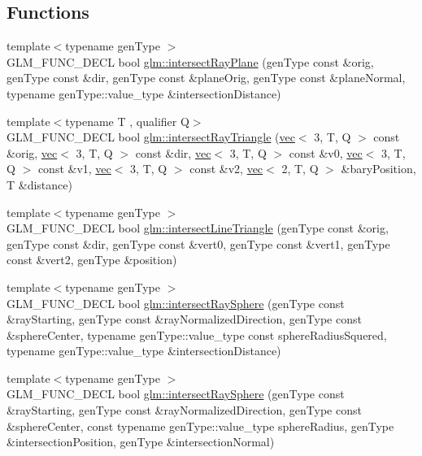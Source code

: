 \subsection*{Functions}
\begin{DoxyCompactItemize}
\item 
{\footnotesize template$<$typename gen\+Type $>$ }\\G\+L\+M\+\_\+\+F\+U\+N\+C\+\_\+\+D\+E\+CL bool \hyperlink{group__gtx__intersect_gad3697a9700ea379739a667ea02573488}{glm\+::intersect\+Ray\+Plane} (gen\+Type const \&orig, gen\+Type const \&dir, gen\+Type const \&plane\+Orig, gen\+Type const \&plane\+Normal, typename gen\+Type\+::value\+\_\+type \&intersection\+Distance)
\item 
{\footnotesize template$<$typename T , qualifier Q$>$ }\\G\+L\+M\+\_\+\+F\+U\+N\+C\+\_\+\+D\+E\+CL bool \hyperlink{group__gtx__intersect_ga65bf2c594482f04881c36bc761f9e946}{glm\+::intersect\+Ray\+Triangle} (\hyperlink{structglm_1_1vec}{vec}$<$ 3, T, Q $>$ const \&orig, \hyperlink{structglm_1_1vec}{vec}$<$ 3, T, Q $>$ const \&dir, \hyperlink{structglm_1_1vec}{vec}$<$ 3, T, Q $>$ const \&v0, \hyperlink{structglm_1_1vec}{vec}$<$ 3, T, Q $>$ const \&v1, \hyperlink{structglm_1_1vec}{vec}$<$ 3, T, Q $>$ const \&v2, \hyperlink{structglm_1_1vec}{vec}$<$ 2, T, Q $>$ \&bary\+Position, T \&distance)
\item 
{\footnotesize template$<$typename gen\+Type $>$ }\\G\+L\+M\+\_\+\+F\+U\+N\+C\+\_\+\+D\+E\+CL bool \hyperlink{group__gtx__intersect_ga9d29b9b3acb504d43986502f42740df4}{glm\+::intersect\+Line\+Triangle} (gen\+Type const \&orig, gen\+Type const \&dir, gen\+Type const \&vert0, gen\+Type const \&vert1, gen\+Type const \&vert2, gen\+Type \&position)
\item 
{\footnotesize template$<$typename gen\+Type $>$ }\\G\+L\+M\+\_\+\+F\+U\+N\+C\+\_\+\+D\+E\+CL bool \hyperlink{group__gtx__intersect_gac88f8cd84c4bcb5b947d56acbbcfa56e}{glm\+::intersect\+Ray\+Sphere} (gen\+Type const \&ray\+Starting, gen\+Type const \&ray\+Normalized\+Direction, gen\+Type const \&sphere\+Center, typename gen\+Type\+::value\+\_\+type const sphere\+Radius\+Squered, typename gen\+Type\+::value\+\_\+type \&intersection\+Distance)
\item 
{\footnotesize template$<$typename gen\+Type $>$ }\\G\+L\+M\+\_\+\+F\+U\+N\+C\+\_\+\+D\+E\+CL bool \hyperlink{group__gtx__intersect_gad28c00515b823b579c608aafa1100c1d}{glm\+::intersect\+Ray\+Sphere} (gen\+Type const \&ray\+Starting, gen\+Type const \&ray\+Normalized\+Direction, gen\+Type const \&sphere\+Center, const typename gen\+Type\+::value\+\_\+type sphere\+Radius, gen\+Type \&intersection\+Position, gen\+Type \&intersection\+Normal)

\end{DoxyCompactItemize}
